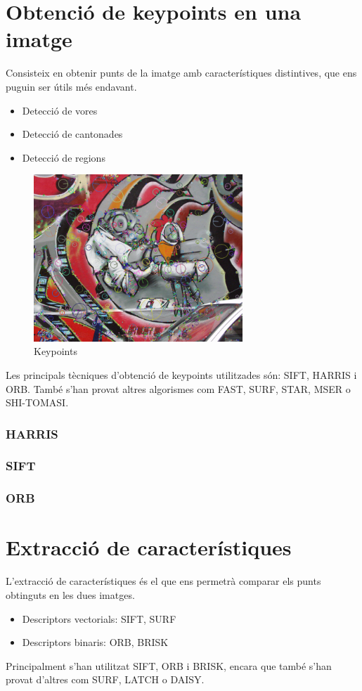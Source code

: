 \section{Obtenció de keypoints en una imatge}
	Consisteix en obtenir punts de la imatge amb característiques distintives, que ens puguin ser útils més endavant.
	\begin{itemize}	
		\item{Detecció de vores}
		\item{Detecció de cantonades}
		\item{Detecció de regions}
	\end{itemize}
	\begin{figure}[H]
		\centering
		\includegraphics[width=0.7\textwidth]{images/RobotKp}
		\caption{Keypoints}
	\end{figure}
	Les principals tècniques d'obtenció de keypoints utilitzades són: SIFT, HARRIS i ORB.
	També s'han provat altres algorismes com FAST, SURF, STAR, MSER o SHI-TOMASI.

	\subsubsection{HARRIS}
	\subsubsection{SIFT}
	\subsubsection{ORB}

\section{Extracció de característiques}

	L'extracció de característiques és el que ens permetrà comparar els punts obtinguts en les dues imatges.
	\begin{itemize}
		\item{Descriptors vectorials: SIFT, SURF}
		\item{Descriptors binaris: ORB, BRISK}
	\end{itemize}
	Principalment s'han utilitzat SIFT, ORB i BRISK, encara que també s'han provat d'altres com SURF, LATCH o DAISY.

